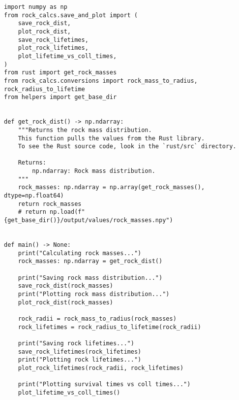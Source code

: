 \begin{lstlisting}
import numpy as np
from rock_calcs.save_and_plot import (
    save_rock_dist,
    plot_rock_dist,
    save_rock_lifetimes,
    plot_rock_lifetimes,
    plot_lifetime_vs_coll_times,
)
from rust import get_rock_masses
from rock_calcs.conversions import rock_mass_to_radius, rock_radius_to_lifetime
from helpers import get_base_dir


def get_rock_dist() -> np.ndarray:
    """Returns the rock mass distribution.
    This function pulls the values from the Rust library.
    To see the Rust source code, look in the `rust/src` directory.

    Returns:
        np.ndarray: Rock mass distribution.
    """
    rock_masses: np.ndarray = np.array(get_rock_masses(), dtype=np.float64)
    return rock_masses
    # return np.load(f"{get_base_dir()}/output/values/rock_masses.npy")


def main() -> None:
    print("Calculating rock masses...")
    rock_masses: np.ndarray = get_rock_dist()

    print("Saving rock mass distribution...")
    save_rock_dist(rock_masses)
    print("Plotting rock mass distribution...")
    plot_rock_dist(rock_masses)

    rock_radii = rock_mass_to_radius(rock_masses)
    rock_lifetimes = rock_radius_to_lifetime(rock_radii)

    print("Saving rock lifetimes...")
    save_rock_lifetimes(rock_lifetimes)
    print("Plotting rock lifetimes...")
    plot_rock_lifetimes(rock_radii, rock_lifetimes)

    print("Plotting survival times vs coll times...")
    plot_lifetime_vs_coll_times()
\end{lstlisting}